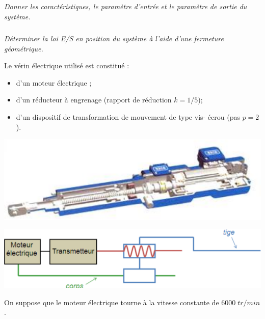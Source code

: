 \documentclass[11pt,oneside]{article}
\begin{document}
\subparagraph{}
\textit{Donner les caractéristiques, le paramètre d’entrée et le paramètre de sortie du système.}


\subparagraph{}
\textit{Déterminer la loi E/S en position du système à l’aide d’une fermeture géométrique. }



\vspace{.5cm}

\begin{minipage}[c]{.45\linewidth}
Le vérin électrique utilisé est constitué : 
\begin{itemize}
\item d’un moteur électrique ;
\item d’un réducteur à engrenage (rapport de réduction $k=1/5$);
\item d’un dispositif de transformation de mouvement de type vis-
écrou (pas $p=2$). 
\end{itemize}
\end{minipage} \hfill
\begin{minipage}[c]{.5\linewidth}
\begin{center}
\includegraphics[width=.95\textwidth]{png/fig7} 
\end{center}
\end{minipage} 

\begin{center}
\includegraphics[width=.8\textwidth]{png/fig8} 
\end{center}

On suppose que le moteur électrique tourne à la vitesse constante de $6000\; tr/min$. 
\end{document}
